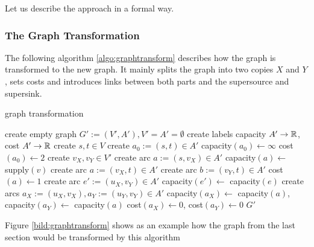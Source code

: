 Let us describe the approach in a formal way.

\subsubsection*{The Graph Transformation}

The following algorithm \ref{algo:graphtransform} describes how the graph is transformed to the new graph. It mainly 
splits the graph into two copies $X$ and $Y$, sets costs and introduces links between both parts and the 
supersource and supersink.

\begin{algorithm}
 \caption{graph transformation}
 \label{algo:graphtransform}
 \begin{algorithmic}[5]
  \State create empty graph $G':=(V',A'), V'=A'=\emptyset$
  \State create labels capacity $A'\to \mathbb{R}$, cost $A'\to \mathbb{R}$%
  \State create $s, t\in V$ 
  \State create $a_0 :=(s,t) \in A'$
  \State capacity$(a_0)\gets\infty$ 
  \State cost$(a_0)\gets 2$ 
    \State create $v_X, v_Y\in V'$
      \State create arc $a:=(s,v_X)\in A'$
      \State capacity$(a)\gets$ supply$(v)$
      \State create arc $a:=(v_X, t)\in A'$
      \State create arc $b:=(v_Y,t)\in A'$
      \State cost$(a)\gets 1$
    \EndIf
  \EndFor
      \State create arc $e':=(u_X, v_Y)\in A'$
      \State capacity$(e')\gets$ capacity$(e)$
    \Else
      \State create arcs $a_X:=(u_X, v_X), a_Y:=(u_Y, v_Y)\in A'$
      \State capacity$(a_X)\gets$ capacity$(a)$, capacity$(a_Y)\gets$ capacity$(a)$
      \State cost$(a_X)\gets 0$, cost$(a_Y)\gets0$
    \EndIf
  \EndFor
  \State \Return $G'$
  \EndFunction
 \end{algorithmic}

\end{algorithm}

Figure \ref{bild:graphtransform} shows as an example how the graph from the last section would be transformed by this 
algorithm

